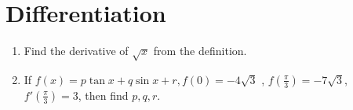 \documentclass[14pt]{article}
\begin{document}
\begin{multicols}{2}
\begin{enumerate}
\end{enumerate} 

\section{Differentiation}
\noindent
\begin{enumerate}
\item Find the derivative of $\sqrt{x}$ from the definition.

\item If $f(x) = p \tan x + q \sin x + r, f(0) = -4\sqrt{3}$ , $f\left(\frac{\pi}{3}\right)=-7\sqrt{3} $, $f'\left(\frac{\pi}{3}\right)=3$, then find $ p,q,r.$
\end{enumerate} 


\end{multicols}
 
\end{document}
